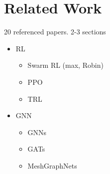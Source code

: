
\chapter{Related Work}
20 referenced papers. 2-3 sections
\begin{itemize}[noitemsep,nolistsep]
	\item RL
	\begin{itemize}[noitemsep,nolistsep]
        \item Swarm RL (max, Robin)
        \item PPO
        \item TRL
    \end{itemize}
    
	\item GNN
	\begin{itemize}[noitemsep,nolistsep]
        \item GNNs
        \item GATs
        \item MeshGraphNets
    \end{itemize}
\end{itemize}
